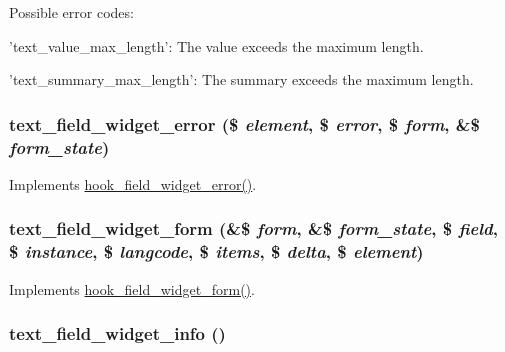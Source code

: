 Possible error codes:
\begin{DoxyItemize}
\item 'text\_\-value\_\-max\_\-length': The value exceeds the maximum length.
\item 'text\_\-summary\_\-max\_\-length': The summary exceeds the maximum length. 
\end{DoxyItemize}\hypertarget{text_8module_a6ca0cbd6b13e1893a1655fcb404e6b76}{
\subsubsection[{text\_\-field\_\-widget\_\-error}]{\setlength{\rightskip}{0pt plus 5cm}text\_\-field\_\-widget\_\-error (\$ {\em element}, \/  \$ {\em error}, \/  \$ {\em form}, \/  \&\$ {\em form\_\-state})}}
\label{text_8module_a6ca0cbd6b13e1893a1655fcb404e6b76}
Implements \hyperlink{group__field__widget_ga9a2031578542fef9e296d79c946431fd}{hook\_\-field\_\-widget\_\-error()}. \hypertarget{text_8module_a4eb0394997c0e7511c717b9c6fd7590e}{
\subsubsection[{text\_\-field\_\-widget\_\-form}]{\setlength{\rightskip}{0pt plus 5cm}text\_\-field\_\-widget\_\-form (\&\$ {\em form}, \/  \&\$ {\em form\_\-state}, \/  \$ {\em field}, \/  \$ {\em instance}, \/  \$ {\em langcode}, \/  \$ {\em items}, \/  \$ {\em delta}, \/  \$ {\em element})}}
\label{text_8module_a4eb0394997c0e7511c717b9c6fd7590e}
Implements \hyperlink{group__field__widget_gaa9b0e55fd0eb57ac0f9c7c30d251971b}{hook\_\-field\_\-widget\_\-form()}. \hypertarget{text_8module_aacf1cec61c2dbad31fb5ab8a1ee98085}{
\subsubsection[{text\_\-field\_\-widget\_\-info}]{\setlength{\rightskip}{0pt plus 5cm}text\_\-field\_\-widget\_\-info ()}}
